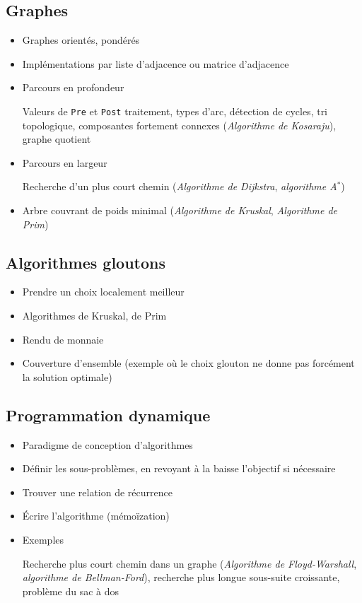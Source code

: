 \documentclass[10pt,a4paper]{article}
\begin{document}
\subsection{Graphes}

%
\begin{itemize}[noitemsep]
	\item Graphes orientés, pondérés
	\item Implémentations par liste d'adjacence ou matrice d'adjacence
	\item Parcours en profondeur
	
		Valeurs de \texttt{Pre} et \texttt{Post} traitement, types d'arc, détection de cycles, tri topologique, composantes fortement  connexes (\emph{Algorithme de Kosaraju}), graphe quotient
	\item Parcours en largeur
	
		Recherche d'un plus court chemin (\emph{Algorithme de Dijkstra}, \emph{algorithme A\(^*\)})
	\item Arbre couvrant de poids minimal (\emph{Algorithme de Kruskal}, \emph{Algorithme de Prim})
\end{itemize}
%


\subsection{Algorithmes gloutons}

\begin{itemize}[noitemsep]
	\item Prendre un choix localement meilleur
	\item Algorithmes de Kruskal, de Prim
	\item Rendu de monnaie
	\item Couverture d'ensemble (exemple où le choix glouton ne donne pas forcément la solution optimale)
\end{itemize}


\subsection{Programmation dynamique}

\begin{itemize}[noitemsep]
	\item Paradigme de conception d'algorithmes
	\item Définir les sous-problèmes, en revoyant à la baisse l'objectif si nécessaire
	\item Trouver une relation de récurrence
	\item Écrire l'algorithme (mémoïzation)
	\item Exemples
	
		Recherche plus court chemin dans un graphe (\emph{Algorithme de Floyd-Warshall}, \emph{algorithme de Bellman-Ford}), recherche plus longue sous-suite croissante, problème du sac à dos
\end{itemize}
\end{document}
